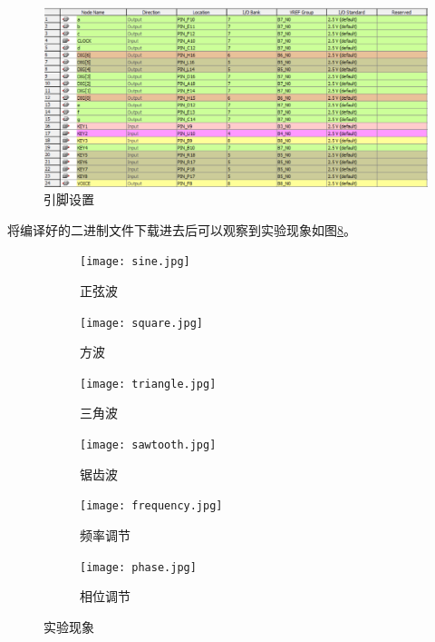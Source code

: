 \documentclass[twoside, openright]{article}
\begin{document}

\begin{figure}[htbp]
	\centering
	\includegraphics[width = 0.8\linewidth]{pin.png}
	\caption{引脚设置}
	\label{fig:引脚设置}
\end{figure}

将编译好的二进制文件下载进去后可以观察到实验现象如图\ref{fig:实验现象}。

\begin{figure}[htbp]
	\centering
	\begin{subfigure}[htbp]{.45\linewidth}
		\centering
		\texttt{[image: sine.jpg]}
		\caption{正弦波}
		\label{fig:正弦波}
	\end{subfigure}
	\quad
	\begin{subfigure}[htbp]{.45\linewidth}
		\centering
		\texttt{[image: square.jpg]}
		\caption{方波}
		\label{fig:方波}
	\end{subfigure}

	\begin{subfigure}[htbp]{.45\linewidth}
		\centering
		\texttt{[image: triangle.jpg]}
		\caption{三角波}
		\label{fig:三角波}
	\end{subfigure}
	\quad
	\begin{subfigure}[htbp]{.45\linewidth}
		\centering
		\texttt{[image: sawtooth.jpg]}
		\caption{锯齿波}
		\label{fig:锯齿波}
	\end{subfigure}

	\begin{subfigure}[htbp]{.45\linewidth}
		\centering
		\texttt{[image: frequency.jpg]}
		\caption{频率调节}
		\label{fig:频率调节}
	\end{subfigure}
	\quad
	\begin{subfigure}[htbp]{.45\linewidth}
		\centering
		\texttt{[image: phase.jpg]}
		\caption{相位调节}
		\label{fig:相位调节}
	\end{subfigure}
	\caption{实验现象}
	\label{fig:实验现象}
\end{figure}
\end{document}
